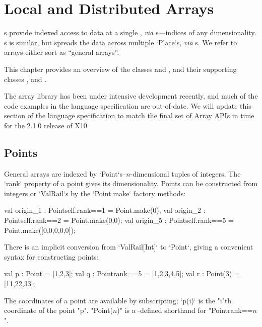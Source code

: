 \chapter{Local and Distributed Arrays}\label{XtenArrays}

s provide indexed access to data at a single , {\em via}
s---indices of any dimensionality. s is similar, but
spreads the data across multiple \xcd`Place`s, {\em via} s.  
We refer to arrays either sort as ``general arrays''.  


This chapter provides an overview of the  classes 
and , and their supporting classes , 
and .  

The array library has been under intensive development recently, and
much of the code examples in the language specification are
out-of-date.  We will update this section of the language specification
to match the final set of Array APIs in time for the 2.1.0 release of X10.


\section{Points}\label{point-syntax}

General arrays are indexed by \xcd`Point`s--$n$-dimensional tuples of
integers.  The \xcd`rank`
property of a point gives its dimensionality.  Points can be constructed from
integers or \xcd`ValRail`s by
the \xcd`Point.make` factory methods:
\begin{xten}
val origin_1 : Point{self.rank==1} = Point.make(0);
val origin_2 : Point{self.rank==2} = Point.make(0,0);
val origin_5 : Point{self.rank==5} = Point.make([0,0,0,0,0]);
\end{xten}

There is an implicit conversion from \xcd`ValRail[Int]` to \xcd`Point`, giving
a convenient syntax for constructing points: 

\begin{xten}
val p : Point = [1,2,3];
val q : Point{rank==5} = [1,2,3,4,5];
val r : Point(3) = [11,22,33];
\end{xten}

The coordinates of a point are available by subscripting; \xcd`p(i)` is the
\xcd"i"th coordinate of the point \xcd"p". 
\xcdmath"Point($n$)" is a -defined shorthand  for 
\xcdmath"Point{rank==$n$}".


